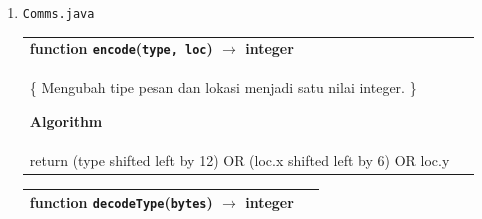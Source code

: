 \documentclass{article}
\newenvironment{pseudobox}
{
\centering
\begin{longtable}{|p{0.94\linewidth}|}
\hline
}
{
\\ \hline
\end{longtable}
\vspace{0.05cm}
}
\begin{document}
\begin{enumerate}[label=\alph*.]
\begin{pseudobox}
\textbf{procedure \texttt{tryAttackEnemies}(\texttt{rc})}

\textbf{Algorithm} \\

\hspace*{1.5em}for each enemy robot nearby do \\

\hspace*{3em}if \texttt{rc.canAttack(enemy location)} then \\

\hspace*{4.5em}\texttt{rc.attack(enemy location)} \\

\hspace*{4.5em}if enemy is a tower then \\
\hspace*{6em}report enemy tower location \\
\hspace*{4.5em}endif \\

\hspace*{4.5em}\texttt{rc.attack(null)} \\
\hspace*{4.5em}return \\

\hspace*{3em}endif \\

\hspace*{1.5em}endfor \\
\end{pseudobox}

\item \texttt{Comms.java}

\begin{pseudobox}
\textbf{function \texttt{encode}(\texttt{type, loc}) $\rightarrow$ integer} \\
\{ Mengubah tipe pesan dan lokasi menjadi satu nilai integer. \}

\textbf{Algorithm} \\

\hspace*{1.5em}return (type shifted left by 12) OR (loc.x shifted left by 6) OR loc.y
\end{pseudobox}

\begin{pseudobox}
\textbf{function \texttt{decodeType}(\texttt{bytes}) $\rightarrow$ integer}


\end{pseudobox}
\end{enumerate}
\end{document}
